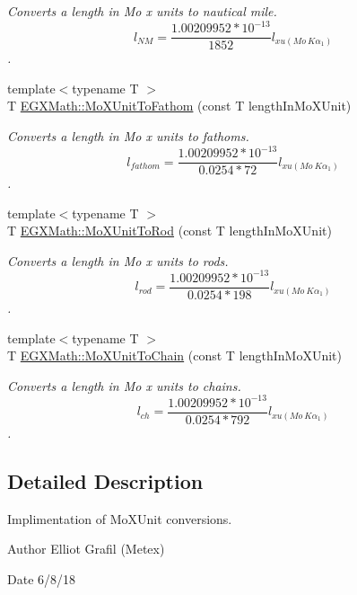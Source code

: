\begin{DoxyCompactItemize}
\begin{DoxyCompactList}\small\item\em Converts a length in Mo x units to nautical mile. \[ l_{NM}= \frac{1.00209952*10^{-13}}{1852} l_{xu(Mo\ K\alpha_1)} \]. \end{DoxyCompactList}\item 
{\footnotesize template$<$typename T $>$ }\\T \mbox{\hyperlink{group___e_g_x_math-_conversions-_length_conversions-_non-_s_i-_mo_x_unit-_nautical_gaac0c77d19dcc5ce04affa038de610b4a}{E\+G\+X\+Math\+::\+Mo\+X\+Unit\+To\+Fathom}} (const T length\+In\+Mo\+X\+Unit)
\begin{DoxyCompactList}\small\item\em Converts a length in Mo x units to fathoms. \[ l_{fathom}= \frac{1.00209952*10^{-13}}{0.0254 * 72} l_{xu(Mo\ K\alpha_1)} \]. \end{DoxyCompactList}\item 
{\footnotesize template$<$typename T $>$ }\\T \mbox{\hyperlink{group___e_g_x_math-_conversions-_length_conversions-_non-_s_i-_mo_x_unit-_surveyors_ga087c126bbeacfc3f9786ce20c1d9c2e1}{E\+G\+X\+Math\+::\+Mo\+X\+Unit\+To\+Rod}} (const T length\+In\+Mo\+X\+Unit)
\begin{DoxyCompactList}\small\item\em Converts a length in Mo x units to rods. \[ l_{rod}= \frac{1.00209952*10^{-13}}{0.0254 * 198} l_{xu(Mo\ K\alpha_1)} \]. \end{DoxyCompactList}\item 
{\footnotesize template$<$typename T $>$ }\\T \mbox{\hyperlink{group___e_g_x_math-_conversions-_length_conversions-_non-_s_i-_mo_x_unit-_surveyors_ga07a643eb483183e8d391856d32f5a519}{E\+G\+X\+Math\+::\+Mo\+X\+Unit\+To\+Chain}} (const T length\+In\+Mo\+X\+Unit)
\begin{DoxyCompactList}\small\item\em Converts a length in Mo x units to chains. \[ l_{ch}= \frac{1.00209952*10^{-13}}{0.0254 * 792} l_{xu(Mo\ K\alpha_1)} \]. \end{DoxyCompactList}\end{DoxyCompactItemize}


\subsection{Detailed Description}
Implimentation of Mo\+X\+Unit conversions. 

\begin{DoxyAuthor}{Author}
Elliot Grafil (Metex) 
\end{DoxyAuthor}
\begin{DoxyDate}{Date}
6/8/18 
\end{DoxyDate}
